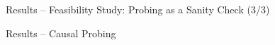 \documentclass[aspectratio=169]{beamer}
\begin{document}
\begin{frame}{Results -- Feasibility Study: Probing as a Sanity Check (3/3)}
    \begin{figure}[!ht]
        \centering
    \end{figure}
\end{frame}

\begin{frame}{Results -- Causal Probing}
    \begin{figure}[!ht]
        \centering
    \end{figure}
\end{frame}
\end{document}

